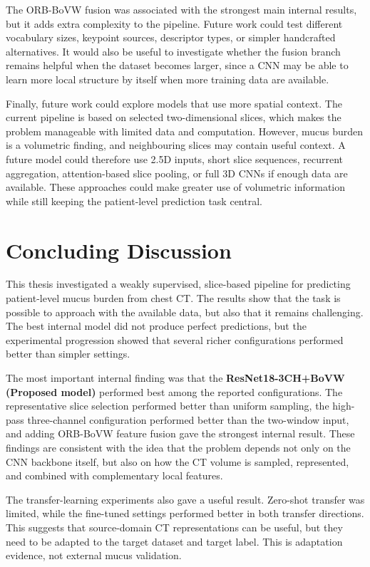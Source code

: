 The ORB-BoVW fusion was associated with the strongest main internal results, but it adds extra complexity to the pipeline. Future work could test different vocabulary sizes, keypoint sources, descriptor types, or simpler handcrafted alternatives. It would also be useful to investigate whether the fusion branch remains helpful when the dataset becomes larger, since a CNN may be able to learn more local structure by itself when more training data are available.

Finally, future work could explore models that use more spatial context. The current pipeline is based on selected two-dimensional slices, which makes the problem manageable with limited data and computation. However, mucus burden is a volumetric finding, and neighbouring slices may contain useful context. A future model could therefore use 2.5D inputs, short slice sequences, recurrent aggregation, attention-based slice pooling, or full 3D CNNs if enough data are available. These approaches could make greater use of volumetric information while still keeping the patient-level prediction task central.


\section{Concluding Discussion}
This thesis investigated a weakly supervised, slice-based pipeline for predicting patient-level mucus burden from chest CT. The results show that the task is possible to approach with the available data, but also that it remains challenging. The best internal model did not produce perfect predictions, but the experimental progression showed that several richer configurations performed better than simpler settings.

The most important internal finding was that the \textbf{ResNet18-3CH+BoVW (Proposed model)} performed best among the reported configurations. The representative slice selection performed better than uniform sampling, the high-pass three-channel configuration performed better than the two-window input, and adding ORB-BoVW feature fusion gave the strongest internal result. These findings are consistent with the idea that the problem depends not only on the CNN backbone itself, but also on how the CT volume is sampled, represented, and combined with complementary local features.

The transfer-learning experiments also gave a useful result. Zero-shot transfer was limited, while the fine-tuned settings performed better in both transfer directions. This suggests that source-domain CT representations can be useful, but they need to be adapted to the target dataset and target label. This is adaptation evidence, not external mucus validation.

